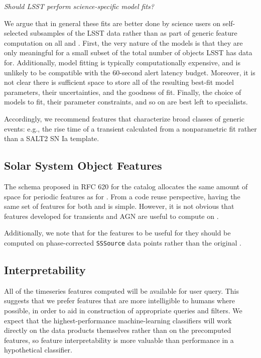\documentclass[DM,authoryear,toc]{lsstdoc}
\begin{document}
\textit{Should LSST perform science-specific model fits?}

We argue that in general these fits are better done by science users on self-selected subsamples of the LSST data rather than as part of generic feature computation on all \DIAObjects and \Objects.
First, the very nature of the models is that they are only meaningful for a small subset of the total number of objects LSST has data for.  
Additionally, model fitting is typically computationally expensive, and is unlikely to be compatible with the 60-second alert latency budget.
Moreover, it is not clear there is sufficient space to store all of the resulting best-fit model parameters, their uncertainties, and the goodness of fit.
Finally, the choice of models to fit, their parameter constraints, and so on are best left to specialists.

Accordingly, we recommend features that characterize broad classes of generic events: e.g., the rise time of a transient calculated from a nonparametric fit rather than a SALT2 SN Ia template.


\subsection{Solar System Object Features}

The schema proposed in RFC 620 for the \SSObject catalog allocates the same amount of space for periodic 
features as for \DIAObjects.
From a code reuse perspective, having the same set of features for both \DIAObjects and \SSObjects is simple.
However, it is not obvious that features developed for transients and AGN are useful to compute on \SSObjects.

Additionally, we note that for the features to be useful for \SSObjects they should be computed on phase-corrected \texttt{SSSource} data points rather than the original \DIASources.

\subsection{Interpretability} \label{sec:interpretability}

All of the timeseries features computed will be available for user query.
This suggests that we prefer features that are more intelligible to humans where possible, in order to aid in construction of appropriate queries and filters.
We expect that the highest-performance machine-learning classifiers will work directly on the data products themselves rather than on the precomputed features, so feature interpretability is more valuable than performance in a hypothetical classifier.
\end{document}
